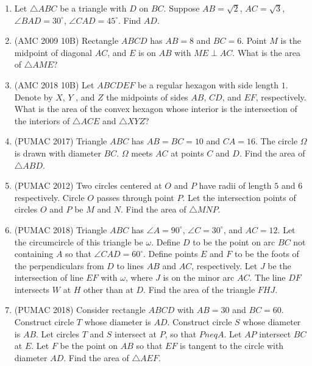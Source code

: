 \documentclass[11pt]{scrartcl}
\begin{document}
\begin{enumerate}[resume]
    \item Let $\triangle ABC$ be a triangle with $D$ on $BC$. Suppose $AB = \sqrt{2}$, $AC = \sqrt{3}$, $\angle BAD = 30^\circ$, $\angle CAD = 45^\circ$. Find $AD$.

    \item (AMC 2009 10B) Rectangle $ABCD$ has $AB = 8$ and $BC = 6$. Point $M$ is the midpoint of diagonal $AC$, and $E$ is on $AB$ with $ME \perp AC$. What is the area of $\triangle AME$?


    \item (AMC 2018 10B) Let $ABCDEF$ be a regular hexagon with side length $1$. Denote by $X$, $Y$ , and $Z$ the midpoints of sides $AB$, $CD$, and $EF$, respectively. What is the area of the convex hexagon whose interior is the intersection of the interiors of $\triangle ACE$ and $\triangle XYZ$?


    \item (PUMAC 2017) Triangle $ABC$ has $AB = BC = 10$ and $CA = 16$. The circle $\Omega$ is drawn with diameter $BC$. $\Omega$ meets $AC$ at points $C$ and $D$. Find the area of $\triangle ABD$.


    \item (PUMAC 2012) Two circles centered at $O$ and $P$ have radii of length $5$ and $6$ respectively. Circle $O$ passes through point $P$. Let the intersection points of circles $O$ and $P$ be $M$ and $N$. Find the area of $\triangle MNP$.


    \item (PUMAC 2018) Triangle $ABC$ has $\angle A = 90^\circ$, $\angle C = 30^\circ$, and $AC = 12$. Let the circumcircle of this triangle be $\omega$. Define $D$ to be the point on arc $BC$ not containing $A$ so that $\angle CAD = 60^\circ$. Define points $E$ and $F$ to be the foots of the perpendiculars from $D$ to lines $AB$ and $AC$, respectively. Let $J$ be the intersection of line $EF$ with $\omega$, where $J$ is on the minor arc $AC$. The line $DF$ intersects $W$ at $H$ other than at $D$. Find the area of the triangle $FHJ$.


    \item (PUMAC 2018) Consider rectangle $ABCD$ with $AB = 30$ and $BC = 60$. Construct circle $T$ whose diameter is $AD$. Construct circle $S$ whose diameter is $AB$. Let circles $T$ and $S$ intersect at $P$, so that $Pneq A$. Let $AP$ intersect $BC$ at $E$. Let $F$ be the point on $AB$ so that $EF$ is tangent to the circle with diameter $AD$. Find the area of $\triangle AEF$.
\end{enumerate}
\end{document}
